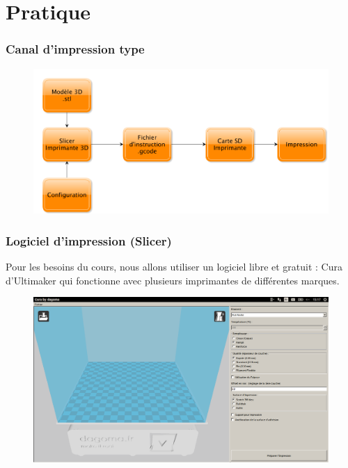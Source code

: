 \documentclass{article}
\begin{document}
\part{Pratique}
\setcounter{section}{0}
\section{Canal d'impression type}
\begin{figure}[h!]
\centering
\includegraphics[scale=0.35]{./images/canalimpression.png}
\end{figure}\hfill
\newpage
\section{Logiciel d'impression (Slicer)}
Pour les besoins du cours, nous allons utiliser un logiciel libre et gratuit : Cura d'Ultimaker qui fonctionne avec plusieurs imprimantes de différentes marques.
\begin{figure}[h!]
\centering
\includegraphics[scale=0.25]{./images/cura1.png}
\end{figure}\hfill 
\end{document}
